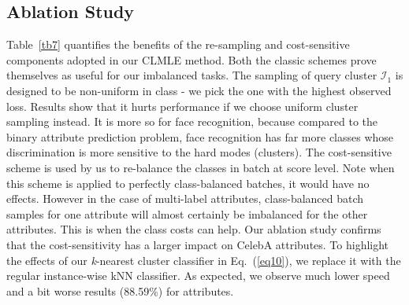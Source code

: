 \documentclass[10pt,journal,compsoc]{IEEEtran}
\begin{document}
\begin{table}[!t]
\caption{Mean class-balanced accuracy (\%) on CIFAR-100~\cite{Krizhevsky09} and MNIST-rot-back-image~\cite{Larochelle07} datasets with simulated class imbalance (with parameter $\gamma$ - the smaller, the more imbalanced). Triplet+ denotes triplet loss~\cite{Schroff15} with over-sampling and cost sensitivity. Balanced baseline denotes the CE+CRL results under class-balanced setting.}
\centering
{}
\label{tb8}
\end{table}

\subsection{Ablation Study}
Table~\ref{tb7} quantifies the benefits of the re-sampling and cost-sensitive components adopted in our CLMLE method. Both the classic schemes prove themselves as useful for our imbalanced tasks. The sampling of query cluster $\mathcal{I}_1$ is designed to be non-uniform in class - we pick the one with the highest observed loss. Results show that it hurts performance if we choose uniform cluster sampling instead. It is more so for face recognition, because compared to the binary attribute prediction problem, face recognition has far more classes whose discrimination is more sensitive to the hard modes (clusters). The cost-sensitive scheme is used by us to re-balance the classes in batch at score level. Note when this scheme is applied to perfectly class-balanced batches, it would have no effects. However in the case of multi-label attributes, class-balanced batch samples for one attribute will almost certainly be imbalanced for the other attributes. This is when the class costs can help. Our ablation study confirms that the cost-sensitivity has a larger impact on CelebA attributes. To highlight the effects of our \textit{k}-nearest cluster classifier in Eq.~(\ref{eq10}), we replace it with the regular instance-wise kNN classifier. As expected, we observe much lower speed and a bit worse results (88.59\%) for attributes.
\end{document}

